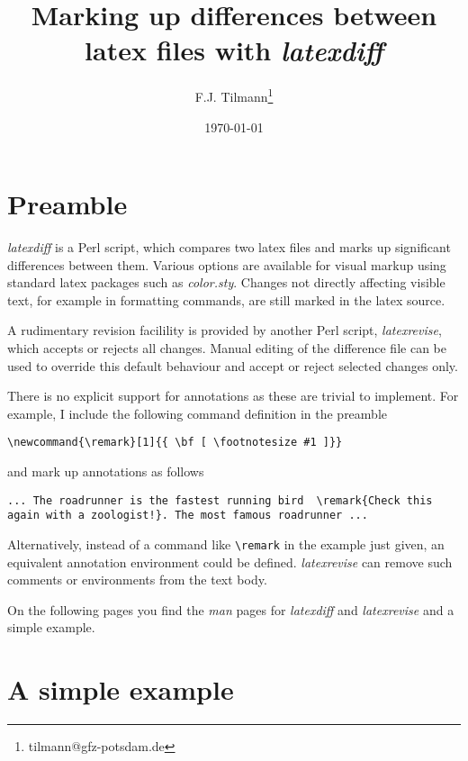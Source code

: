 \documentclass[a4]{article}
\title{Marking up differences between latex files with {\em latexdiff}}
\author{F.J. Tilmann\thanks{tilmann@gfz-potsdam.de}}
\date{\today}
\begin{document}
\maketitle

\section*{Preamble}

{\em latexdiff} is a Perl script, which compares two
latex files and marks up significant differences between them.  Various options are available for visual markup using standard
latex packages such as {\em color.sty}. Changes not directly affecting visible
text, for example in formatting  commands, are still marked in the
latex source.

A rudimentary revision facilility is provided by another Perl script,
{\em latexrevise}, which  accepts or rejects all changes.  Manual editing
of the difference file can be used to override this default behaviour
and accept or reject selected changes only.  

There is no explicit support for annotations as these are trivial to implement.
For example, I include the following command definition in the preamble
\begin{verbatim}
\newcommand{\remark}[1]{{ \bf [ \footnotesize #1 ]}}
\end{verbatim}
and mark up annotations as follows 
\begin{verbatim}
... The roadrunner is the fastest running bird  \remark{Check this 
again with a zoologist!}. The most famous roadrunner ...
\end{verbatim}
Alternatively, instead of a command like \verb#\remark# in the example just given, an
equivalent annotation environment could be defined.
{\em latexrevise} can  remove such comments or
environments from the text body.


On the following pages you find  the {\em man} pages for {\em
  latexdiff} and {\em latexrevise} and a simple example.


\setcounter{section}{0}


\setcounter{section}{0}


\setcounter{section}{0}

\section*{A simple example}
\end{document}

